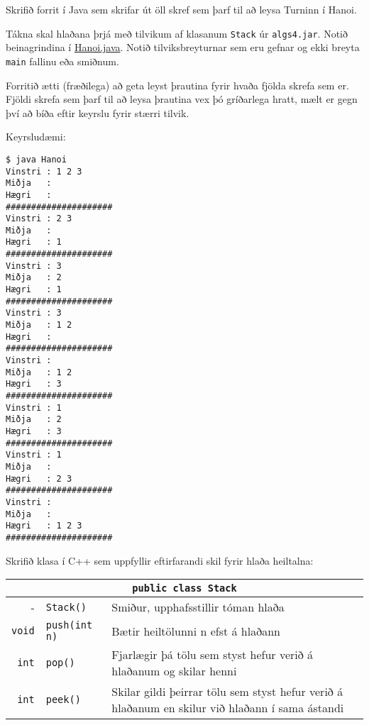 \documentclass{article}
\begin{document}
Skrifið forrit í Java sem skrifar út öll skref sem þarf til að leysa Turninn í Hanoi.

Tákna skal hlaðana þrjá með tilvikum af klasanum \texttt{Stack} úr \texttt{algs4.jar}. Notið beinagrindina í \href{https://raw.githubusercontent.com/Ernir/kennsluefni/master/T2/Code/w5/Hanoi.java}{Hanoi.java}. Notið tilviksbreyturnar sem eru gefnar og ekki breyta \texttt{main} fallinu eða smiðnum.

Forritið ætti (fræðilega) að geta leyst þrautina fyrir hvaða fjölda skrefa sem er. Fjöldi skrefa sem þarf til að leysa þrautina vex þó gríðarlega hratt, mælt er gegn því að bíða eftir keyrslu fyrir stærri tilvik.

Keyrsludæmi:

\begin{verbatim}
$ java Hanoi
Vinstri : 1 2 3 
Miðja   : 
Hægri   : 
#####################
Vinstri : 2 3 
Miðja   : 
Hægri   : 1 
#####################
Vinstri : 3 
Miðja   : 2 
Hægri   : 1 
#####################
Vinstri : 3 
Miðja   : 1 2 
Hægri   : 
#####################
Vinstri : 
Miðja   : 1 2 
Hægri   : 3 
#####################
Vinstri : 1 
Miðja   : 2 
Hægri   : 3 
#####################
Vinstri : 1 
Miðja   : 
Hægri   : 2 3 
#####################
Vinstri : 
Miðja   : 
Hægri   : 1 2 3 
#####################    
\end{verbatim}

\newpage

\question
Skrifið klasa í C++ sem uppfyllir eftirfarandi skil fyrir hlaða heiltalna:

\begin{center}
	\begin{tabularx}{\textwidth}{rlX}
		\toprule
		\multicolumn{3}{c}{\texttt{public class Stack}}                                                                                        \\
		\midrule
		-             & \texttt{Stack()}     & Smiður, upphafsstillir tóman hlaða                                                              \\
		\texttt{void} & \texttt{push(int n)} & Bætir heiltölunni n efst á hlaðann                                                              \\
		\texttt{int}  & \texttt{pop()}       & Fjarlægir þá tölu sem styst hefur verið á hlaðanum og skilar henni                              \\
		\texttt{int}  & \texttt{peek()}      & Skilar gildi þeirrar tölu sem styst hefur verið á hlaðanum en skilur við hlaðann í sama ástandi \\
		\bottomrule
	\end{tabularx}
\end{center}
\end{document}

